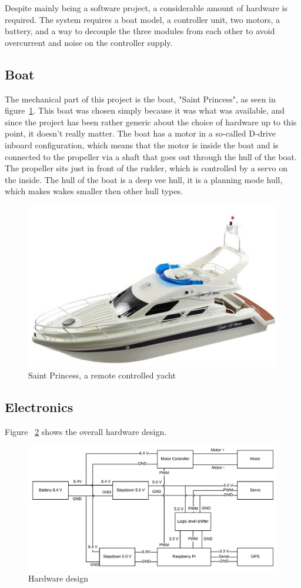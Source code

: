 Despite mainly being a software project, a considerable amount of hardware is required. The system requires a boat model, a controller unit, two motors, a battery, and a way to decouple the three modules from each other to avoid overcurrent and noise on the controller supply. 


\subsection{Boat}
The mechanical part of this project is the boat, "Saint Princess", as seen in figure~\ref{fig:saintprincess}. This boat was chosen simply because it was what was available, and since the project has been rather generic about the choice of hardware up to this point, it doesn't really matter. The boat has a motor in a so-called D-drive inboard configuration\cite{motor_config}, which means that the motor is inside the boat and is connected to the propeller via a shaft that goes out through the hull of the boat. The propeller sits just in front of the rudder, which is controlled by a servo on the inside. The hull of the boat is a deep vee hull\cite{hull-types}, it is a planning mode hull, which makes wakes smaller then other hull types.

\begin{figure}[H]
\centering
\includegraphics[width=0.5\linewidth]{saint_princess}
\caption{Saint Princess, a remote controlled yacht\cite{saint_princess}}
\label{fig:saintprincess}
\end{figure}

\subsection{Electronics}

Figure ~\ref{fig:hardware_design} shows the overall hardware design. 

\begin{figure}[H]
\centering
\includegraphics[width=1\linewidth]{Hardware_design}
\caption{Hardware design}
\label{fig:hardware_design}
\end{figure}

